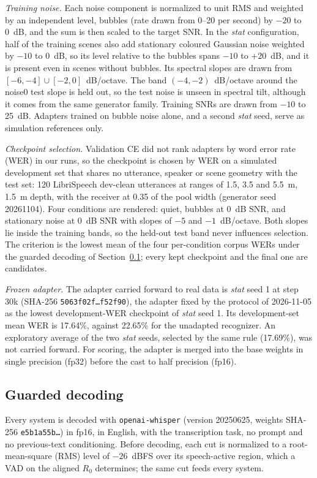 \documentclass[conference]{IEEEtran}
\begin{document}
\textit{Training noise.} Each noise component is normalized to unit RMS and weighted by an
independent level, bubbles (rate drawn from 0--20 per second) by $-20$ to 0~dB, and the sum is then
scaled to the target SNR. In the \emph{stat} configuration, half of the training scenes also add
stationary coloured Gaussian noise weighted by $-10$ to 0~dB, so its level relative to the bubbles
spans $-10$ to $+20$~dB, and it is present even in scenes without bubbles. Its spectral slopes are drawn
from $[-6,-4] \cup [-2,0]$~dB/octave. The band $(-4,-2)$~dB/octave around the noise0 test slope is held
out, so the test noise is unseen in spectral tilt, although it comes from the same generator family.
Training SNRs are drawn from $-10$ to 25~dB. Adapters trained on bubble noise alone, and a second
\emph{stat} seed, serve as simulation references only.

\textit{Checkpoint selection.} Validation CE did not rank adapters by word error rate (WER) in our
runs, so the checkpoint is chosen by WER on a simulated development set that shares no utterance,
speaker or scene geometry with the test set: 120 LibriSpeech dev-clean utterances at ranges of 1.5, 3.5
and 5.5~m, 1.5~m depth, with the receiver at 0.35 of the pool width (generator seed 20261104). Four
conditions are rendered: quiet, bubbles at 0~dB SNR, and stationary noise at 0~dB SNR with slopes of
$-5$ and $-1$~dB/octave. Both slopes lie inside the training bands, so the held-out test band never
influences selection. The criterion is the lowest mean of the four per-condition corpus WERs under the
guarded decoding of Section~\ref{sec:decode}; every kept checkpoint and the final one are candidates.

\textit{Frozen adapter.} The adapter carried forward to real data is \emph{stat} seed 1 at step 30k
(SHA-256 \texttt{5063f02f\ldots f52f90}), the adapter fixed by the protocol of 2026-11-05 as the
lowest development-WER checkpoint of \emph{stat} seed 1. Its development-set mean WER is 17.64\%,
against 22.65\% for the unadapted recognizer. An exploratory average of the two \emph{stat} seeds,
selected by the same rule (17.69\%), was not carried forward. For scoring, the adapter is merged into
the base weights in single precision (fp32) before the cast to half precision (fp16).

\subsection{Guarded decoding}
\label{sec:decode}
Every system is decoded with \texttt{openai-whisper} (version 20250625, weights SHA-256 \texttt{e5b1a55b\ldots}) in fp16,
in English, with the transcription task, no prompt and no previous-text conditioning. Before decoding,
each cut is normalized to a root-mean-square (RMS) level of $-26$~dBFS over its speech-active region, which a VAD on the aligned
$R_0$ determines; the same cut feeds every system.
\end{document}
